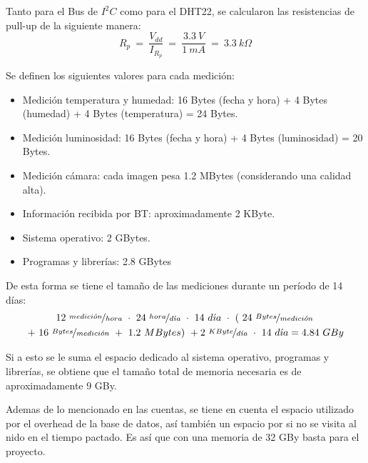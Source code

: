 
Tanto para el Bus de $I^2C$ como para el DHT22, se calcularon las resistencias de pull-up de la siguiente manera:
\begin{equation}
	R_p \ = \  \frac{V_{dd}}{I_{R_p}} \ = \ \frac{3.3 \ V}{1 \ mA} \ = \ 3.3 \ k\Omega  
\end{equation}

Se definen los siguientes valores para cada medici\'on:
\begin{itemize}
	\item Medición temperatura y humedad: 16 Bytes (fecha y hora) + 4 Bytes (humedad) + 4 Bytes (temperatura) = 24 Bytes.
	\item Medición luminosidad: 16 Bytes (fecha y hora) + 4 Bytes (luminosidad) = 20 Bytes.
	\item Medición cámara: cada imagen pesa 1.2 MBytes \cite{ref:rpicam} (considerando una calidad alta).
	\item Información recibida por BT: aproximadamente 2 KByte.
	\item Sistema operativo: 2 GBytes.
	\item Programas y librerías: 2.8 GBytes
\end{itemize}

De esta forma se tiene el tamaño de las mediciones durante un período de 14 días:
\begin{multline*}
	12 \ \nicefrac{medici\acute{o}n}{hora} \  \cdot \ 24 \ \nicefrac{hora}{d\acute{\imath}a} \  \cdot \ 14 \ d\acute{\imath}a \  \cdot \ \left( \ 24 \  \nicefrac{Bytes}{medici\acute{o}n} \right. \\ \left. + \ 16 \ \nicefrac{Bytes}{medici\acute{o}n} \ + \ 1.2 \ MBytes \right) \ + 2 \ \nicefrac{KByte}{d\acute{\imath}a} \  \cdot \  14 \ d\acute{\imath}a = 4.84 \ GBy
\end{multline*}



Si a esto se le suma el espacio dedicado al sistema operativo, programas y librerías, se obtiene que el tamaño total de memoria necesaria es de aproximadamente 9 GBy.

Ademas de lo mencionado en las cuentas, se tiene en cuenta el espacio utilizado por el overhead de la base de datos, así también un espacio por si no se visita al nido en el tiempo pactado. Es así que con una memoria de 32 GBy basta para el proyecto.